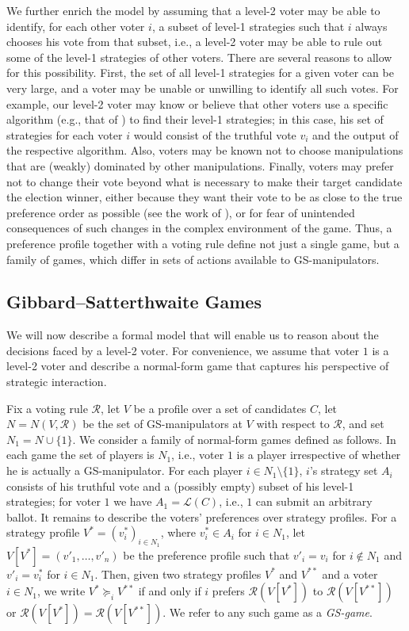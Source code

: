 \documentclass[11pt]{article}
\newcommand{\calR}{\mathcal{R}}
\newcommand{\calL}{\mathcal{L}}
\begin{document}
We further enrich the model by assuming that a level-2 voter may be able
to identify, for each other voter $i$, a subset of level-1 strategies
such that $i$ always chooses his vote from that subset, i.e., a level-2 voter
may be able to rule out some of the level-1 strategies of other voters.
There are several reasons to allow for this possibility. First, the set of all level-1 strategies
for a given voter can be very large, and a voter may be unable or unwilling to identify all 
such votes. 
For example, our level-2 voter may know or believe that other voters use a specific algorithm (e.g., that of \cite{btt89})
to find their level-1 strategies; 
in this case, his set of strategies for each voter $i$ would consist of the truthful vote $v_i$ 
and the output of the respective algorithm. Also, voters may be known not to choose 
manipulations that are (weakly) dominated by other manipulations.  
Finally, voters may prefer not to change their vote beyond what is necessary to make their target 
candidate the election winner, either because they want their vote to be as close to the true preference order as 
possible (see the work of \cite{obr-elk:c:opt}), 
or for fear of unintended consequences of such changes in the complex environment of the game.
Thus, a preference profile together with a voting rule define not just a single game, but a family
of games, which differ in sets of actions available to GS-manipulators.


\subsection{Gibbard--Satterthwaite Games}\label{sec:gs}
We will now describe a formal model that will enable us to reason about the decisions 
faced by a level-2 voter. For convenience, we assume that voter $1$ is a level-2 voter and describe
a normal-form game that captures his perspective of strategic interaction.

Fix a voting rule $\calR$, let $V$ be a profile over a set of candidates $C$, 
let $N=N(V,\calR)$ be the set of GS-manipulators at $V$ with respect to $\calR$, and set $N_1=N\cup\{1\}$.
We consider a family of normal-form games defined as follows. 
In each game the set of players is $N_1$, i.e., voter $1$ is a player irrespective
of whether he is actually a GS-manipulator. 
For each player $i\in N_1\setminus\{1\}$, $i$'s strategy set $A_i$ consists of his truthful vote
and a (possibly empty) subset of his level-1 strategies;
for voter $1$ we have $A_1=\calL(C)$, i.e., $1$ can submit an arbitrary ballot.
It remains to describe the voters' preferences over strategy profiles.
For a strategy profile $V^* = (v^*_i)_{i\in N_1}$, where $v^*_i\in A_i$ for $i\in N_1$,
let $V[V^*]=(v'_1, \dots, v'_n)$ be the preference profile
such that $v'_i=v_i$ for $i\not \in N_1$ and $v'_i=v^*_i$ for $i\in N_1$.
Then, given two strategy profiles $V^*$ and $V^{**}$ and a voter $i\in N_1$,
we write $V^*\succeq_i V^{**}$ if and only if  $i$ prefers
$\calR(V[V^*])$ to $\calR(V[V^{**}])$ or $\calR(V[V^*])=\calR(V[V^{**}])$.
We refer to any such game as a {\em GS-game}.  
\end{document}
